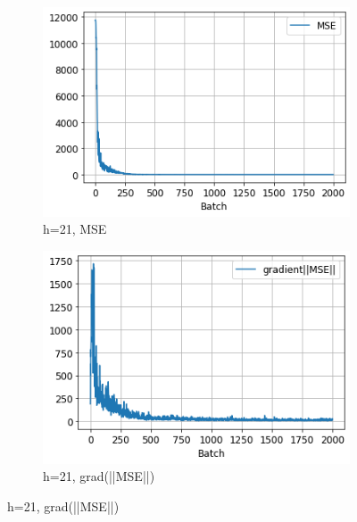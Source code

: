 \documentclass{homework}
\begin{document}
\begin{figure}[H]
\medskip
\begin{subfigure}{0.4\textwidth}
\includegraphics[width=\linewidth]{h21_MSE.png}
\caption{h=21, MSE} \label{fig:c}
\end{subfigure}\hspace*{\fill}
\begin{subfigure}{0.4\textwidth}
\includegraphics[width=\linewidth]{h21_gradient.png}
\caption{h=21, grad(||MSE||)} \label{fig:d}
\end{subfigure}


\end{figure}
\end{document}
